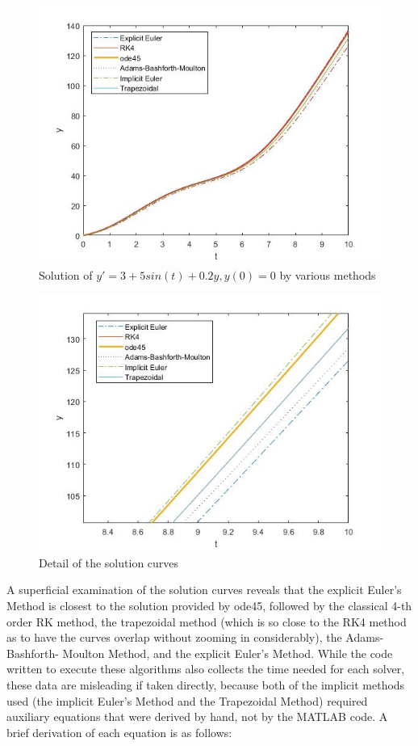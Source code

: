 \documentclass[11pt]{article}
\begin{document}
\begin{figure} [ht]
\centering
        \includegraphics[totalheight=10cm]{Plot1aa.jpg}
    \caption{Solution of $y'=3+5sin(t)+0.2y, y(0)=0$ by various methods}
    \label{figure1}
\end{figure}

\newpage

\begin{figure} [ht]
\centering
        \includegraphics[totalheight=10cm]{Plot1ab.jpg}
    \caption{Detail of the solution curves}
    \label{figure2}
\end{figure}

A superficial examination of the solution curves reveals that the explicit Euler's
Method is closest to the solution provided by ode45, followed by the classical 
4-th order RK method, the trapezoidal method (which is so close to the RK4 method
as to have the curves overlap without zooming in considerably), the Adams-Bashforth-
Moulton Method, and the explicit Euler's Method. While the code written to execute
these algorithms also collects the time needed for each solver, these data are 
misleading if taken directly, because both of the implicit methods used (the implicit
Euler's Method and the Trapezoidal Method) required auxiliary equations that were
derived by hand, not by the MATLAB code. A brief derivation of each equation is
as follows:
\end{document}
